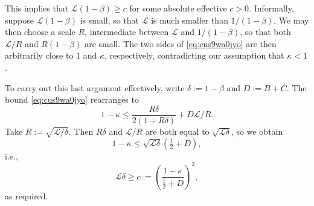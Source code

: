 \documentclass[reqno]{amsart} 
\begin{document}
This implies that $\mathcal{L}(1 - \beta) \geq c$ for some absolute effective $c > 0$.  Informally, suppose $\mathcal{L}(1 - \beta)$ is small, so that $\mathcal{L}$ is much smaller than $1 /(1 - \beta)$.  We may then choose a scale $R$, intermediate between $\mathcal{L}$ and $1/(1 - \beta)$, so that both $\mathcal{L} / R$ and $R(1 - \beta)$ are small.  The two sides of \eqref{eq:cus9wa0jyo} are then arbitrarily close to $1$ and $\kappa$, respectively, contradicting our assumption that $\kappa < 1$.

To carry out this last argument effectively, write $\delta := 1 - \beta$ and $D := B + C$.  The bound \eqref{eq:cus9wa0jyo} rearranges to
\begin{equation*}
  1 - \kappa \leq \frac{R \delta}{2(1 +R \delta)} + D \mathcal{L} / R.
\end{equation*}
Take $R := \sqrt{\mathcal{L} / \delta}$.  Then $R \delta$ and $\mathcal{L} / R$ are both equal to $\sqrt{\mathcal{L} \delta}$, so we obtain
\begin{equation*}
  1 - \kappa \leq \sqrt{\mathcal{L} \delta}(\tfrac{1}{2} + D),
\end{equation*}
i.e.,
\begin{equation*}
  \mathcal{L} \delta \geq c := \left( \frac{1 - \kappa}{\tfrac{1}{2} + D} \right)^2,
\end{equation*}
as required.

{} 
\end{document}
